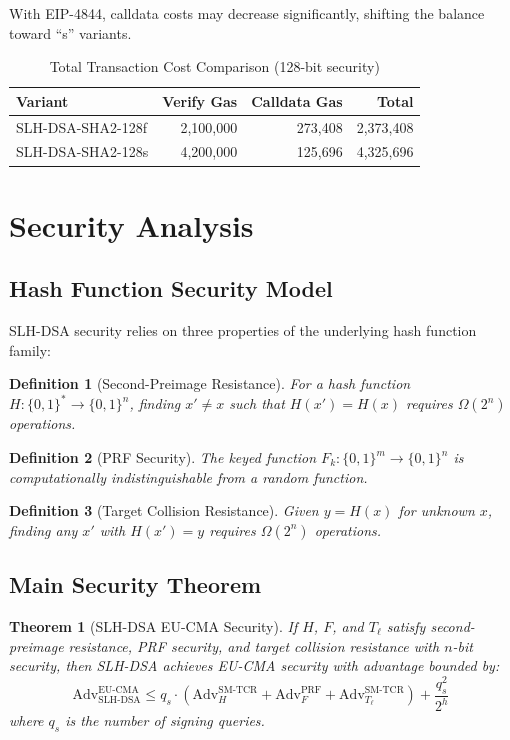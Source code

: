 \documentclass[11pt,a4paper]{article}
\newtheorem{theorem}{Theorem}
\newtheorem{definition}{Definition}
\begin{document}
With EIP-4844, calldata costs may decrease significantly, shifting the balance toward ``s'' variants.

\begin{table}[htbp]
\centering
\caption{Total Transaction Cost Comparison (128-bit security)}
\label{tab:txcost}
\begin{tabular}{@{}lrrr@{}}
\toprule
Variant & Verify Gas & Calldata Gas & Total \\
\midrule
SLH-DSA-SHA2-128f & 2,100,000 & 273,408 & 2,373,408 \\
SLH-DSA-SHA2-128s & 4,200,000 & 125,696 & 4,325,696 \\
\bottomrule
\end{tabular}
\end{table}

\section{Security Analysis}

\subsection{Hash Function Security Model}

SLH-DSA security relies on three properties of the underlying hash function family:

\begin{definition}[Second-Preimage Resistance]
For a hash function $H: \{0,1\}^* \to \{0,1\}^n$, finding $x' \neq x$ such that $H(x') = H(x)$ requires $\Omega(2^n)$ operations.
\end{definition}

\begin{definition}[PRF Security]
The keyed function $F_k: \{0,1\}^m \to \{0,1\}^n$ is computationally indistinguishable from a random function.
\end{definition}

\begin{definition}[Target Collision Resistance]
Given $y = H(x)$ for unknown $x$, finding any $x'$ with $H(x') = y$ requires $\Omega(2^n)$ operations.
\end{definition}

\subsection{Main Security Theorem}

\begin{theorem}[SLH-DSA EU-CMA Security]
\label{thm:main}
If $H$, $F$, and $T_\ell$ satisfy second-preimage resistance, PRF security, and target collision resistance with $n$-bit security, then SLH-DSA achieves EU-CMA security with advantage bounded by:
\[
\text{Adv}^{\text{EU-CMA}}_{\text{SLH-DSA}} \leq q_s \cdot \left( \text{Adv}^{\text{SM-TCR}}_H + \text{Adv}^{\text{PRF}}_F + \text{Adv}^{\text{SM-TCR}}_{T_\ell} \right) + \frac{q_s^2}{2^h}
\]
where $q_s$ is the number of signing queries.
\end{theorem}
\end{document}
